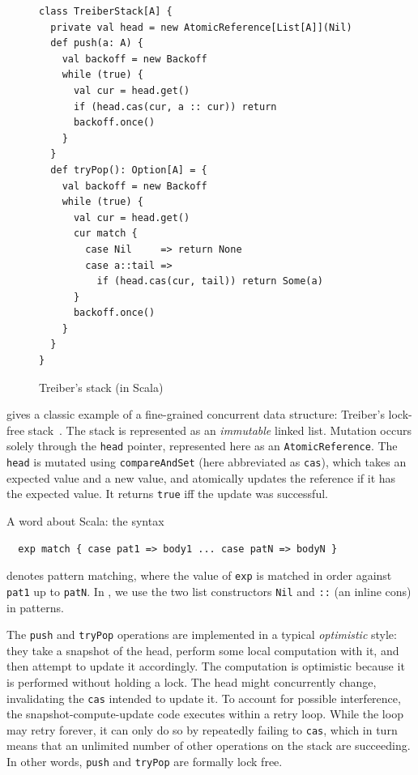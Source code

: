 \documentclass[preprint,nocopyrightspace]{sigplanconf}
\begin{document}
\begin{figure}
\begin{lstlisting}[frame=single]
class TreiberStack[A] {
  private val head = new AtomicReference[List[A]](Nil)
  def push(a: A) {
    val backoff = new Backoff
    while (true) {
      val cur = head.get()
      if (head.cas(cur, a :: cur)) return
      backoff.once()
    }
  }
  def tryPop(): Option[A] = {
    val backoff = new Backoff
    while (true) {
      val cur = head.get() 
      cur match {
        case Nil     => return None
        case a::tail => 
          if (head.cas(cur, tail)) return Some(a)
      }
      backoff.once()
    }
  }
}
\end{lstlisting}
\nocaptionrule
\caption{Treiber's stack (in Scala)}
\label{fig:classic-treiber}
\end{figure}

 gives a classic example of a fine-grained concurrent
data structure: Treiber's lock-free stack~\cite{Treiber1986}.  The stack is
represented as an \emph{immutable} linked list.  Mutation occurs solely through
the \lstinline{head} pointer, represented here as an
\lstinline{AtomicReference}.  The \lstinline{head} is mutated using
\lstinline{compareAndSet} (here abbreviated as \lstinline{cas}), which takes an
expected value and a new value, and atomically updates the reference if it has
the expected value.  It returns \lstinline{true} iff the update was successful.

A word about Scala: the syntax 
\begin{lstlisting}
  exp match { case pat1 => body1 ... case patN => bodyN }
\end{lstlisting}
denotes pattern matching, where the value of \lstinline{exp} is matched in order
against \lstinline{pat1} up to \lstinline{patN}.  In ,
we use the two list constructors \lstinline{Nil} and \lstinline{::} (an inline
cons) in patterns.

The \lstinline{push} and \lstinline{tryPop} operations are implemented in a
typical \emph{optimistic} style: they take a snapshot of the head, perform some
local computation with it, and then attempt to update it accordingly.  The
computation is optimistic because it is performed without holding a lock.  The
head might concurrently change, invalidating the \lstinline{cas} intended to
update it.  To account for possible interference, the snapshot-compute-update
code executes within a retry loop.  While the loop may retry forever, it can
only do so by repeatedly failing to \lstinline{cas}, which in turn means that an
unlimited number of other operations on the stack are succeeding.  In other
words, \lstinline{push} and \lstinline{tryPop} are formally lock
  free.
\end{document}
